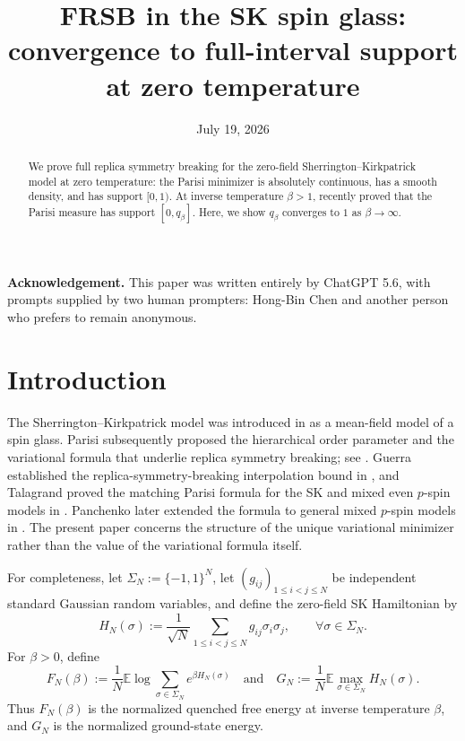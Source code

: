 \documentclass[10pt]{amsart}
\title[FRSB in the SK spin glass]{FRSB in the SK spin glass: convergence to full-interval support at zero temperature}
\author{}
\date{July 19, 2026}
\theoremstyle{definition}
\theoremstyle{remark}
\numberwithin{equation}{section}
\newcommand{\E}{\mathbb E}
\newcommand{\1}{\mathbf 1}
\begin{document}
\begin{abstract}
We prove full replica symmetry breaking for the zero-field Sherrington--Kirkpatrick model at zero temperature: the Parisi minimizer is absolutely continuous, has a smooth density, and has support $[0,1)$. At inverse temperature $\beta>1$, \cite{Lopatto2026} recently proved that the Parisi measure has support $[0,q_\beta]$. Here, we show $q_\beta$ converges to $1$ as $\beta\to\infty$.
\end{abstract}

\maketitle

\noindent\textbf{Acknowledgement.} This paper was written entirely by ChatGPT 5.6, with prompts supplied by two human prompters: Hong-Bin Chen and another person who prefers to remain anonymous.

\tableofcontents

\section{Introduction}
\label{sec:introduction}

The Sherrington--Kirkpatrick model was introduced in \cite{SherringtonKirkpatrick1975} as a mean-field model of a spin glass. Parisi subsequently proposed the hierarchical order parameter and the variational formula that underlie replica symmetry breaking; see \cite{Parisi1979}. Guerra established the replica-symmetry-breaking interpolation bound in \cite[Theorem 3]{Guerra2003}, and Talagrand proved the matching Parisi formula for the SK and mixed even $p$-spin models in \cite[Theorem 1.1]{Talagrand2006}. Panchenko later extended the formula to general mixed $p$-spin models in \cite[Theorem 1]{Panchenko2014}. The present paper concerns the structure of the unique variational minimizer rather than the value of the variational formula itself.

For completeness, let $\Sigma_N:=\{-1,1\}^N$, let $(g_{ij})_{1\leq i<j\leq N}$ be independent standard Gaussian random variables, and define the zero-field SK Hamiltonian by
\begin{equation*}
 H_N(\sigma):=\frac1{\sqrt N}\sum_{1\leq i<j\leq N}g_{ij}\sigma_i\sigma_j,
 \qquad \forall\sigma\in\Sigma_N.
\end{equation*}
For $\beta>0$, define
\begin{equation*}
 F_N(\beta):=\frac1N\E\log\sum_{\sigma\in\Sigma_N}e^{\beta H_N(\sigma)}
 \quad\text{and}\quad
 G_N:=\frac1N\E\max_{\sigma\in\Sigma_N}H_N(\sigma).
\end{equation*}
Thus $F_N(\beta)$ is the normalized quenched free energy at inverse temperature $\beta$, and $G_N$ is the normalized ground-state energy.
\end{document}
